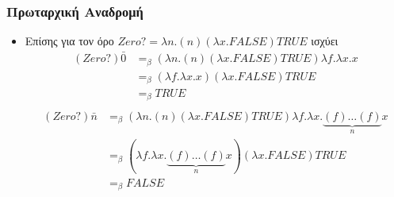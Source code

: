 \documentclass{beamer}
\begin{document}
\begin{frame}
        \frametitle{Πρωταρχική Αναδρομή}
        \begin{itemize}
                \item Επίσης για τον όρο $Zero? = \lambda n. (n) (\lambda x . FALSE) TRUE$ ισχύει
                \pause
                $$\begin{array}{ll}
                (Zero?) \bar{0} & =_\beta (\lambda n. (n) (\lambda x . FALSE) TRUE) \lambda f. \lambda x. x \\
                				& =_\beta (\lambda f. \lambda x. x) (\lambda x . FALSE) TRUE \\
                				& =_\beta TRUE \\
                \end{array}$$                
                \pause
                $$\begin{array}{ll}
                (Zero?) \bar{n} & =_\beta (\lambda n. (n) (\lambda x . FALSE) TRUE) \lambda f . \lambda x . \underbrace{(f) \ldots (f)}_n x \\
                				& =_\beta (\lambda f . \lambda x . \underbrace{(f) \ldots (f)}_n x) (\lambda x . FALSE) TRUE \\
                				& =_\beta FALSE \\
                \end{array}$$                
        \end{itemize}
\end{frame}
\end{document}
